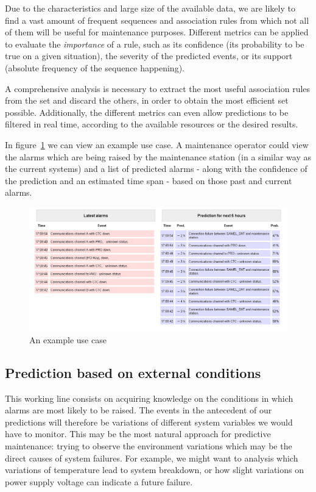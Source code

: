 \documentclass[a4paper,10pt]{report}
\begin{document}
Due to the characteristics and large size of the available data, we are likely to find a vast amount of frequent sequences and association rules from which not all of them will be useful for maintenance purposes. Different metrics can be applied to evaluate the \emph{importance} of a rule, such as its confidence (its probability to be true on a given situation), the severity of the predicted events, or its support (absolute frequency of the sequence happening).

A comprehensive analysis is necessary to extract the most useful association rules from the set and discard the others, in order to obtain the most efficient set possible. Additionally, the different metrics can even allow predictions to be filtered in real time, according to the available resources or the desired results.

In figure~\ref{fig:demo_view} we can view an example use case. A maintenance operator could view the alarms which are being raised by the maintenance station (in a similar way as the current systems) and a list of predicted alarms - along with the confidence of the prediction and an estimated time span - based on those past and current alarms.

\begin{figure}[hbtp]
\includegraphics[width=\textwidth]{img/demo_thales.png}
\caption{An example use case} \label{fig:demo_view}
\end{figure}

\subsection{Prediction based on external conditions}
This working line consists on acquiring knowledge on the conditions in which alarms are most likely to be raised. The events in the antecedent of our predictions will therefore be variations of different system variables we would have to monitor. This may be the most natural approach for predictive maintenance: trying to observe the environment variations which may be the direct causes of system failures. For example, we might want to analysis which variations of temperature lead to system breakdown, or how slight variations on power supply voltage can indicate a future failure.
\end{document}

